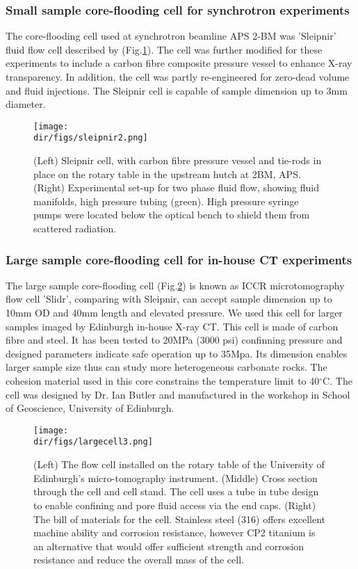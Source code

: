 \subsubsection{Small sample core-flooding cell for synchrotron experiments}
The core-flooding cell used at synchrotron beamline APS 2-BM was 'Sleipnir' fluid flow cell described by \cite{fusseis2014low} (Fig.\ref{sleipnir2}). The cell was further modified for these experiments to include a carbon fibre composite pressure vessel to enhance X-ray transparency. In addition, the cell was partly re-engineered for zero-dead volume and fluid injections. The Sleipnir cell is capable of sample dimension up to 3mm diameter.

\begin{figure}[htbp]
  \centering
  \texttt{[image: \\dir/figs/sleipnir2.png]}
  \caption{(Left) Sleipnir cell, with carbon fibre pressure vessel and tie-rods in place on the rotary table in the upstream hutch at 2BM, APS. (Right) Experimental set-up for two phase fluid flow, showing fluid manifolds, high pressure tubing (green). High pressure syringe pumps were located below the optical bench to shield them from scattered radiation. }
  \label{sleipnir2}
\end{figure}

\subsubsection{Large sample core-flooding cell for in-house CT experiments}
The large sample core-flooding cell (Fig.\ref{largecell3}) is known as ICCR microtomography flow cell 'Slidr', comparing with Sleipnir, can accept sample dimension up to 10mm OD and 40mm length and elevated pressure. We used this cell for larger samples imaged by Edinburgh in-house X-ray \textmu CT. This cell is made of carbon fibre and steel. It has been tested to 20MPa (3000 psi) confinning pressure and designed parameters indicate safe operation up to 35Mpa. Its dimension enables larger sample size thus can study more heterogeneous carbonate rocks. The cohesion material used in this core constrains the temperature limit to 40$^{\circ}$C. The cell was designed by Dr. Ian Butler and manufactured in the workshop in School of Geoscience, University of Edinburgh.

\begin{figure}[htbp]
  \centering
  \texttt{[image: \\dir/figs/largecell3.png]}
  \caption{(Left) The flow cell installed on the rotary table of the University of Edinburgh’s micro-tomography instrument. (Middle) Cross section through the cell and cell stand. The cell uses a tube in tube design to enable confining and pore fluid access via the end caps. (Right) The bill of materials for the cell. Stainless steel (316) offers excellent machine ability and corrosion resistance, however CP2 titanium is an alternative that would offer sufficient strength and corrosion resistance and reduce the overall mass of the cell.}
  \label{largecell3}
\end{figure}

